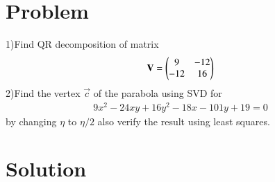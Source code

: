 \documentclass[journal,12pt,twocolumn]{IEEEtran}
\begin{document}
\section{\textbf{Problem}}
1)Find QR decomposition of matrix
\begin{equation}
	\mathbf{V} = \begin{pmatrix}9 & -12\\ -12 & 16\end{pmatrix}
\end{equation}
2)Find the vertex $\vec{c}$ of the parabola using SVD for
\begin{align}
   9x^2-24xy+16y^2-18x-101y+19 = 0 \label{eq:conic}
\end{align}
by changing  $\eta$ to $\eta/2$ also verify the result using least squares.
\section{\textbf{Solution}}
\end{document}
